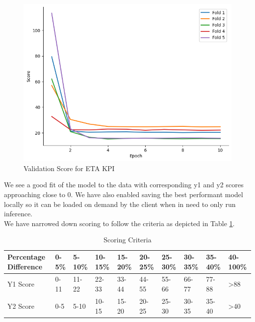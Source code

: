 \documentclass{report} %
\begin{document}
\begin{figure}[H]
    \hfill
    \begin{minipage}[b]{0.325\textwidth}
        \includegraphics[width=\textwidth]{./ReportImages/val_score_y2.png}
        \caption{\centering Validation Score for ETA \ac{KPI}}
        \label{fig:Validation Score for ETA grid}
    \end{minipage}
\end{figure}

We see a good fit of the model to the data with corresponding y1 and y2 scores approaching close to 0.
We have also enabled saving the best performant model locally so it can be loaded on demand by the client when in need to only run inference.\\
We have narrowed down scoring to follow the criteria as depicted in Table \ref{tab:Scoring Criteria}.

\begin{table}[H]
    \centering
    \begin{tabularx}{1\linewidth}{|X|X|X|X|X|X|X|X|X|X|}
    \hline {\bf Percentage Difference} & {\bf 0-5\%} & {\bf 5-10\%} & {\bf 10-15\%} & {\bf 15-20\%} & {\bf 20-25\%} & {\bf 25-30\%} & {\bf 30-35\%} & {\bf 35-40\%} & {\bf 40-100\%}\\
    \hline 
    Y1 Score& 0-11& 11-22 & 22-33 & 33-44 & 44-55& 55-66 & 66-77 & 77-88 & \textgreater 88\\
    Y2 Score& 0-5 & 5-10 & 10-15 & 15-20 & 20-25& 25-30 & 30-35 & 35-40 &\textgreater 40\\
    \hline
    \end{tabularx}
    \caption{Scoring Criteria}
    \label{tab:Scoring Criteria}
\end{table}
\end{document}
